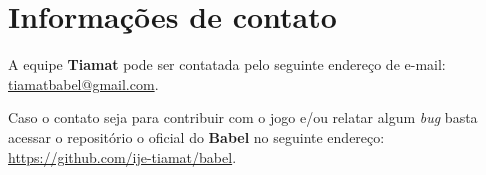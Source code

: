 \documentclass[11pt]{article} %
\begin{document}
\section*{Informações de contato}
A equipe \textbf{Tiamat} pode ser contatada pelo seguinte endereço de e-mail: \href{mailto:tiamatbabel@gmail.com}{tiamatbabel@gmail.com}.

Caso o contato seja para contribuir com o jogo e/ou relatar algum \textit{bug} basta acessar o repositório o oficial do \textbf{Babel} no seguinte endereço: \url{https://github.com/ije-tiamat/babel}.
\end{document}
